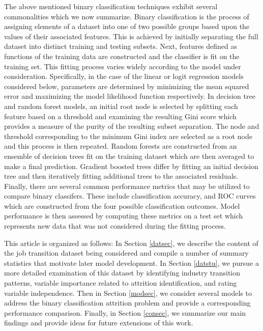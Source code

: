 \documentclass[10pt]{article}
\begin{document}
The above mentioned binary classification techniques exhibit several 
commonalities which we now summarize. 
Binary classification is the process of assigning elements of a dataset into 
one of two possible groups based upon the values of their associated features.
This is achieved by initially separating the full dataset into distinct training 
and testing subsets.  Next, features defined as functions of the training 
data are constructed and the classifier is fit on the training set. This fitting 
process varies widely according to the model under consideration.  Specifically,  
in the case of the linear or logit regression models considered below, parameters are determined by 
minimizing the mean squared error and maximizing the model likelihood function 
respectively.  In decision tree and random forest models, an initial root 
node is selected by splitting each feature based on a threshold and 
examining the resulting Gini score which provides a measure of the purity of the 
    resulting subset separation.  The node and threshold 
    corresponding to the minimum Gini index are selected as a root node 
    and this process is then repeated.  Random forests are constructed 
    from an ensemble of decision trees fit on the training 
    dataset which are then averaged to make a final prediction. 
    Gradient boosted trees differ by fitting an initial decision tree 
    and then iteratively fitting additional trees 
    to the associated residuals.
    Finally, there are several common performance metrics that may 
    be utilized to compare binary classifers.  These include classification 
    accuracy, and ROC curves
    which are constructed from the four possible classification outcomes.
Model 
performance is then assessed by computing these metrics on a test set which represents new data
that was not considered during the fitting process.

This article is organized as follows: In Section \ref{datsec}, we describe the content 
of the job transition dataset being considered and compile a number of 
summary statistics that motivate later model development.  In Section \ref{datstu},
we pursue a more detailed examination of this dataset by identifying industry transition 
patterns, variable importance related to attrition identification, and 
rating variable independence.  Then in Section \ref{modsec}, we consider several 
models to address the binary classification attrition problem and provide a 
corresponding performance comparison.  Finally, in Section \ref{consec}, we 
summarize our main findings and provide ideas for future extensions of this work.
\end{document}
